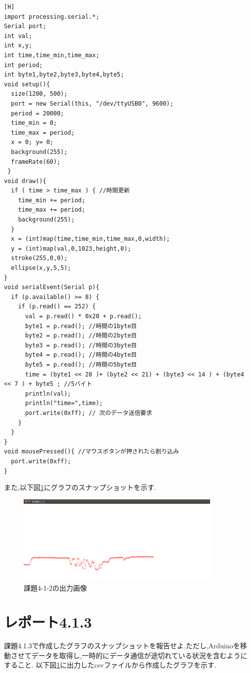 \documentclass{jarticle}
\begin{document}
\begin{lstlisting}[caption = 課題4.1.2(Processing),label=code:kadai4-1-2-p][H]
import processing.serial.*;
Serial port;
int val;
int x,y;
int time,time_min,time_max;
int period;
int byte1,byte2,byte3,byte4,byte5;
void setup(){
  size(1200, 500);
  port = new Serial(this, "/dev/ttyUSB0", 9600);
  period = 20000;
  time_min = 0;
  time_max = period;
  x = 0; y= 0;
  background(255);
  frameRate(60);
 }
void draw(){
  if ( time > time_max ) { //時間更新
    time_min += period;
    time_max += period;
    background(255);
  }
  x = (int)map(time,time_min,time_max,0,width);
  y = (int)map(val,0,1023,height,0);
  stroke(255,0,0);
  ellipse(x,y,5,5);
}
void serialEvent(Serial p){
  if (p.available() >= 8) {
    if (p.read() == 252) {
      val = p.read() * 0x20 + p.read();
      byte1 = p.read(); //時間の1byte目
      byte2 = p.read(); //時間の2byte目
      byte3 = p.read(); //時間の3byte目
      byte4 = p.read(); //時間の4byte目
      byte5 = p.read(); //時間の5byte目
      time = (byte1 << 28 )+ (byte2 << 21) + (byte3 << 14 ) + (byte4 << 7 ) + byte5 ; //5バイト
      println(val);
      println("time=",time);
      port.write(0xff); // 次のデータ送信要求
    }
  }
}
void mousePressed(){ //マウスボタンが押されたら割り込み
  port.write(0xff);
}
\end{lstlisting}

また,以下図\ref{fig:kadai4-1-2}にグラフのスナップショットを示す.

\begin{figure}[H]
\begin{center}
\includegraphics[width=10.0cm]{images/kadai4-1-2.png}
\caption{課題4-1-2の出力画像}
\label{fig:kadai4-1-2}
\end{center}
\end{figure}

\section{レポート4.1.3}
課題4.1.3で作成したグラフのスナップショットを報告せよ.ただし,Arduinoを移動させてデータを取得し,一時的にデータ通信が途切れている状況を含むようにすること.
以下図\ref{fig:kadai4-1-2}に出力したcsvファイルから作成したグラフを示す.
\end{document}
